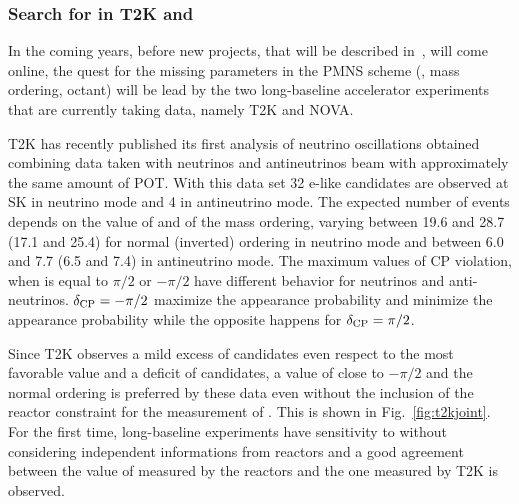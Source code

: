 \subsubsection{Search for \dcp in T2K and \nova}
In the coming years, before new projects, that will be described in~\cite{sec:future}, will come online, the quest for the missing parameters in the PMNS scheme (\dcp, mass ordering, \thatm octant) will be lead by the two long-baseline accelerator experiments that are currently taking data, namely T2K and NOVA.

T2K has recently published its first analysis of neutrino oscillations obtained combining data taken with neutrinos and antineutrinos beam with approximately the same amount of POT. With this data set 32 e-like candidates are observed at SK in neutrino mode and 4 in antineutrino mode. The expected number of events depends on the value of \dcp and of the mass ordering, varying between 19.6 and 28.7 (17.1 and 25.4) for normal (inverted) ordering in neutrino mode and between 6.0 and 7.7 (6.5 and 7.4) in antineutrino mode. The maximum values of CP violation, when \dcp is equal to $\pi/2$ or $-\pi/2$ have different behavior for neutrinos and anti-neutrinos. $\delta_{\mathrm{CP}}=-\pi/2$ maximize the \nue appearance probability and minimize the \nueb appearance probability while the opposite happens for $\delta_{\mathrm{CP}}=\pi/2$. 

Since T2K observes a mild excess of \nue candidates even respect to the most favorable value and a deficit of \nueb candidates, a value of \dcp close to $-\pi/2$ and the normal ordering is preferred by these data even without the inclusion of the reactor constraint for the measurement of \thint. This is shown in Fig.~\ref{fig:t2kjoint}. For the first time, long-baseline experiments have sensitivity to \dcp without considering independent informations from reactors and a good agreement between the value of \thint measured by the reactors and the one measured by T2K is observed. 

